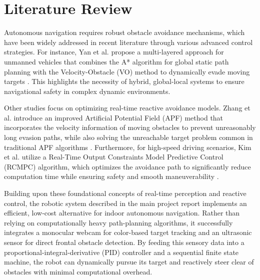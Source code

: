 \section{Literature Review}
\label{sec:tinjauan_pustaka}

Autonomous navigation requires robust obstacle avoidance mechanisms, which have been widely addressed in recent literature through various advanced control strategies. For instance, Yan et al. propose a multi-layered approach for unmanned vehicles that combines the A* algorithm for global static path planning with the Velocity-Obstacle (VO) method to dynamically evade moving targets \cite{9734642}.
This highlights the necessity of hybrid, global-local systems to ensure navigational safety in complex dynamic environments.

Other studies focus on optimizing real-time reactive avoidance models. Zhang et al. introduce an improved Artificial Potential Field (APF) method that incorporates the velocity information of moving obstacles to prevent unreasonably long evasion paths, while also solving the unreachable target problem common in traditional APF algorithms \cite{10409720}.
Furthermore, for high-speed driving scenarios, Kim et al. utilize a Real-Time Output Constraints Model Predictive Control (RCMPC) algorithm, which optimizes the avoidance path to significantly reduce computation time while ensuring safety and smooth maneuverability \cite{8571463}.

Building upon these foundational concepts of real-time perception and reactive control, the robotic system described in the main project report implements an efficient, low-cost alternative for indoor autonomous navigation. Rather than relying on computationally heavy path-planning algorithms, it successfully integrates a monocular webcam for color-based target tracking and an ultrasonic sensor for direct frontal obstacle detection. By feeding this sensory data into a proportional-integral-derivative (PID) controller and a sequential finite state machine, the robot can dynamically pursue its target and reactively steer clear of obstacles with minimal computational overhead.